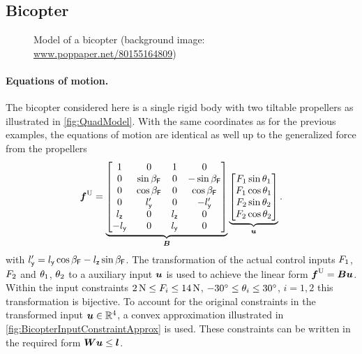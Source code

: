 \subsection{Bicopter}

\begin{figure}[ht]
 \centering
 
 \caption{Model of a bicopter (background image: \url{www.poppaper.net/80155164809})}
 \label{fig:BicopterModel}
\end{figure}

\paragraph{Equations of motion.}
The bicopter considered here is a single rigid body with two tiltable propellers as illustrated in \autoref{fig:QuadModel}.
With the same coordinates as for the previous examples, the equations of motion are identical as well up to the generalized force from the propellers 
\begin{align}
 \genForceInput
 =
 \underbrace{\begin{bmatrix}
  1 & 0 & 1 & 0 \\
  0 & \sin\PropInc & 0 & -\sin\PropInc \\
  0 & \cos\PropInc & 0 & \cos\PropInc \\
  0 & \PropPosY' & 0 & -\PropPosY' \\
  \PropPosZ & 0 & \PropPosZ & 0 \\
  -\PropPosY & 0 & \PropPosY & 0 \\
 \end{bmatrix}}_{\sysInputMat}
 \underbrace{\begin{bmatrix} \PropForce[1] \sin\PropTilt[1] \\ \PropForce[1] \cos\PropTilt[1] \\ \PropForce[2] \sin\PropTilt[2] \\ \PropForce[2] \cos\PropTilt[2] \end{bmatrix}}_{\sysInput}
 .
\end{align}
with $\PropPosY' = \PropPosY \cos\PropInc - \PropPosZ \sin\PropInc$.
The transformation of the actual control inputs $\PropForce[1]$, $\PropForce[2]$ and $\PropTilt[1]$, $\PropTilt[2]$ to a auxiliary input $\sysInput$ is used to achieve the linear form $\genForceInput = \sysInputMat\sysInput$.
Within the input constraints $2\,\unit{N} \leq \PropForce[i] \leq 14\,\unit{N}$, $-30^\circ \leq \PropTilt[i] \leq 30^\circ$, $i=1,2$ this transformation is bijective.
To account for the original constraints in the transformed input $\sysInput\in \RealNum^4$, a convex approximation illustrated in \autoref{fig:BicopterInputConstraintApprox} is used.
These constraints can be written in the required form $\sysInputConstMat \sysInput \leq \sysInputConstVec$.


